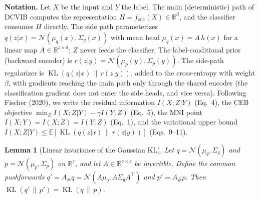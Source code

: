 
\newtheorem{lemma}{Lemma}
\newtheorem{proposition}{Proposition}
\newtheorem{remark}{Remark}

\textbf{Notation.}
Let $X$ be the input and $Y$ the label.
The main (deterministic) path of DCVIB computes the representation
$H = f_{\mathrm{enc}}(X) \in \mathbb{R}^{d}$, and the classifier consumes $H$ directly.
The side path parameterizes $q(z|x) = \mathcal{N}(\mu_q(x), \Sigma_q(x))$ with mean head
$\mu_q(x) = A\,h(x)$ for a linear map $A \in \mathbb{R}^{z \times d}$; $Z$ never feeds the classifier.
The label-conditional prior (backward encoder) is $r(z|y) = \mathcal{N}(\mu_p(y), \Sigma_p(y))$.
The side-path regularizer is $\operatorname{KL}(q(z|x)\,\|\,r(z|y))$, added to the
cross-entropy with weight $\beta$, with gradients reaching the main path only through the
shared encoder (the classification gradient does not enter the side heads, and vice versa).
Following Fischer (2020), we write the residual information $I(X;Z|Y)$ (Eq.~4), the CEB
objective $\min_Z I(X;Z|Y) - \gamma I(Y;Z)$ (Eq.~5), the MNI point
$I(X;Y) = I(X;Z) = I(Y;Z)$ (Eq.~1), and the variational upper bound
$I(X;Z|Y) \le \mathbb{E}[\operatorname{KL}(q(z|x)\,\|\,r(z|y))]$ (Eqs.~9--11).

\begin{lemma}[Linear invariance of the Gaussian KL]\label{lem:kl-invariance}
Let $q = \mathcal{N}(\mu_q, \Sigma_q)$ and $p = \mathcal{N}(\mu_p, \Sigma_p)$ on $\mathbb{R}^{z}$,
and let $A \in \mathbb{R}^{z \times z}$ be invertible. Define the common pushforwards
$q' = A_\# q = \mathcal{N}(A\mu_q, A\Sigma_q A^\top)$ and $p' = A_\# p$. Then
$\operatorname{KL}(q'\,\|\,p') = \operatorname{KL}(q\,\|\,p)$.
\end{lemma}

